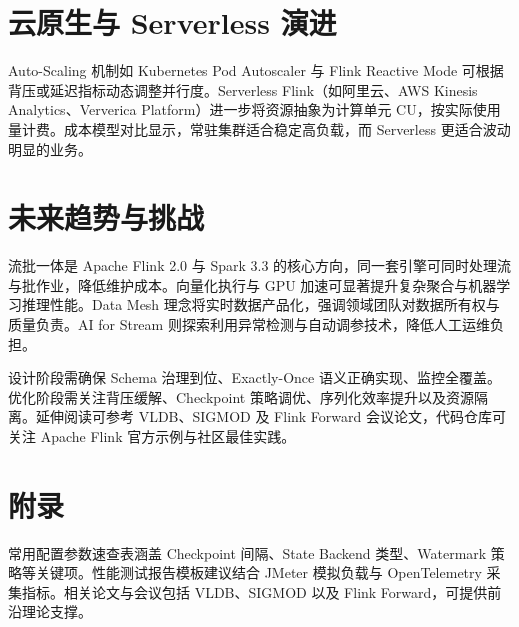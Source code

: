 \chapter{云原生与 Serverless 演进}
Auto-Scaling 机制如 Kubernetes Pod Autoscaler 与 Flink Reactive Mode 可根据背压或延迟指标动态调整并行度。Serverless Flink（如阿里云、AWS Kinesis Analytics、Ververica Platform）进一步将资源抽象为计算单元 CU，按实际使用量计费。成本模型对比显示，常驻集群适合稳定高负载，而 Serverless 更适合波动明显的业务。\par
\chapter{未来趋势与挑战}
流批一体是 Apache Flink 2.0 与 Spark 3.3 的核心方向，同一套引擎可同时处理流与批作业，降低维护成本。向量化执行与 GPU 加速可显著提升复杂聚合与机器学习推理性能。Data Mesh 理念将实时数据产品化，强调领域团队对数据所有权与质量负责。AI for Stream 则探索利用异常检测与自动调参技术，降低人工运维负担。\par
设计阶段需确保 Schema 治理到位、Exactly-Once 语义正确实现、监控全覆盖。优化阶段需关注背压缓解、Checkpoint 策略调优、序列化效率提升以及资源隔离。延伸阅读可参考 VLDB、SIGMOD 及 Flink Forward 会议论文，代码仓库可关注 Apache Flink 官方示例与社区最佳实践。\par
\chapter{附录}
常用配置参数速查表涵盖 Checkpoint 间隔、State Backend 类型、Watermark 策略等关键项。性能测试报告模板建议结合 JMeter 模拟负载与 OpenTelemetry 采集指标。相关论文与会议包括 VLDB、SIGMOD 以及 Flink Forward，可提供前沿理论支撑。\par
